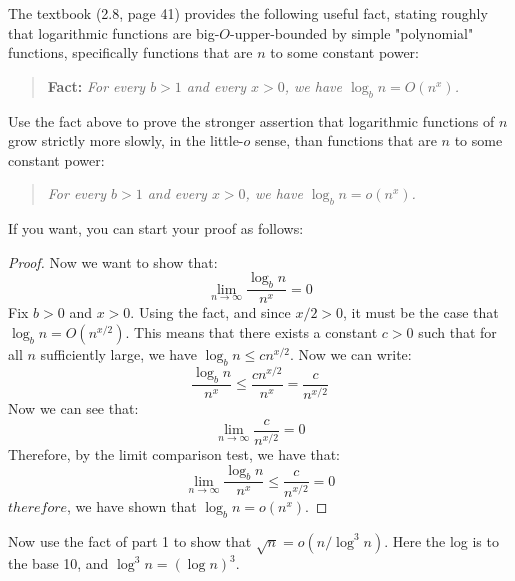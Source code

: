 \documentclass[11pt,fleqn]{exam}
\newenvironment{soln}{\color{solnblue}}{}
\newif\ifsolutions\solutionsfalse
\begin{document}
The textbook (2.8, page 41) provides the following useful fact, stating roughly that logarithmic functions are big-$O$-upper-bounded by
simple "polynomial" functions, specifically functions that are $n$ to some constant power:

\begin{quote}
{\bf Fact:} \emph{For every $b > 1$ and every $x > 0$, we have $\log_b n = O(n^x)$.}
\end{quote}

\begin{questions}
\question[4]
Use the fact above to prove the stronger assertion that logarithmic functions of $n$ grow strictly more slowly, in the little-$o$ sense, than
functions that are $n$ to some constant power:
\begin{quote}
\emph{For every $b > 1$ and every $x > 0$, we have $\log_b n = o(n^x)$.}
\end{quote}

  \ifsolutions
    
\else
If you want, you can start your proof as follows:

\begin{soln}

\begin{proof}
   Now we want to show that:
   \[ \lim_{n \rightarrow \infty} \frac{\log_b n}{n^x} = 0 \]
   Fix $b>0$ and $x>0$. Using the fact, and since $x/2>0$, it must be the case that $\log_b n = O(n^{x/2})$.
   This means that there exists a constant $c>0$ such that for all $n$ sufficiently large, we have $\log_b n \leq c n^{x/2}$.
   Now we can write:
   \[ \frac{\log_b n}{n^x} \leq \frac{cn^{x/2}}{n^x} = \frac{c}{n^{x/2}} \]
   Now we can see that:
   \[ \lim_{n \rightarrow \infty} \frac{c}{n^{x/2}} = 0 \]
   Therefore, by the limit comparison test, we have that:
   \[ \lim_{n \rightarrow \infty} \frac{\log_b n}{n^x} \leq \frac{c}{n^{x/2}} = 0 \]
   $therefore$, we have shown that $\log_b n = o(n^x)$.
   
\end{proof}


\end{soln}
\fi

\question[4]
Now use the fact of part 1 to show that $\sqrt{n} = o(n/\log^3 n)$. Here the log is to the base 10, and $\log^3 n = (\log n)^3$.


\end{questions}
\end{document}
